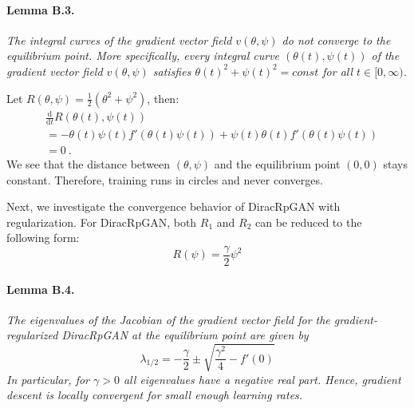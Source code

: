 \paragraph{Lemma B.3.} \emph{The integral curves of the gradient vector field $v(\theta, \psi)$ do not converge to the equilibrium point. More specifically, every integral curve $(\theta(t), \psi(t))$ of the gradient vector field $v(\theta, \psi)$ satisfies $\theta(t)^2 + \psi(t)^2 = const$ for all $t \in [0, \infty)$.}

Let $R(\theta, \psi) = \frac{1}{2} (\theta^2 + \psi^2)$, then:
\begin{align}
    & \frac{\mathrm{d}}{\mathrm{d}t} R(\theta(t), \psi(t)) \nonumber \\
    &= -\theta(t) \psi(t) f'(\theta(t) \psi(t)) + \psi(t) \theta(t) f'(\theta(t) \psi(t)) \nonumber \\
    &= 0\ .
\end{align}
We see that the distance between $(\theta, \psi)$ and the equilibrium point $(0,0)$ stays constant. Therefore, training runs in circles and never converges.

Next, we investigate the convergence behavior of DiracRpGAN with regularization. For DiracRpGAN, both $R_1$ and $R_2$ can be reduced to the following form:
\begin{equation}
    R(\psi) = \frac{\gamma}{2} \psi^2
\end{equation}

\paragraph{Lemma B.4.} \emph{The eigenvalues of the Jacobian of the gradient vector field for the gradient-regularized DiracRpGAN at the equilibrium point are given by
\begin{equation}
\label{eq:ev}
    \lambda_{1/2} = -\frac{\gamma}{2} \pm \sqrt{\frac{\gamma^2}{4}-f'(0)}
\end{equation}
In particular, for $\gamma > 0$ all eigenvalues have a negative real part. Hence, gradient descent is locally convergent for small enough learning rates.}

